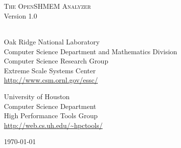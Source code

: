 \begin{titlepage}
  \begin{center}

    \vspace{1.0in} ~ \\

    \HRule \\[0.1in]
    {\LARGE \textsc{The OpenSHMEM Analyzer}} \\
    \vspace{0.2in}
    {\LARGE Version 1.0} \\
    \HRule \\[0.5in]

    \vspace{0.5in}

    Oak Ridge National Laboratory \\
    Computer Science Department and Mathematics Division \\
    Computer Science Research Group \\
    Extreme Scale Systems Center \\
    \vspace{0.1in}
    {\small \url{http://www.csm.ornl.gov/essc/}}

    \vspace{0.4in}

    University of Houston \\
    Computer Science Department \\
    High Performance Tools Group \\
    \vspace{0.1in}
    {\small \url{http://web.cs.uh.edu/~hpctools/}}

    \vspace{1.0in}

    \today

  \end{center}
\end{titlepage}
